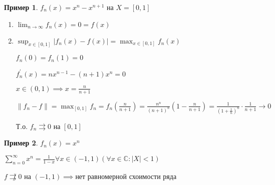 \documentclass{book}
\renewcommand\C{\ensuremath{\mathbb{C}}}
\newcommand{\p}[1]{#1^{\prime}}
\theoremstyle{definition}
\newtheorem*{example}{Пример}
\begin{document}
    \begin{example}
        $f_n(x) = x^n - x^{n+1}$ на  $X = [0,1]$

         \begin{enumerate}
             \item $\lim_{n \to \infty} f_n(x) = 0 = f(x)$
             \item $\sup_{x\in [0,1]}|f_n(x) - f(x)| = \max_{x\in [0,1]} f_n(x)$ 

                 $f_n(0) = f_n(1) = 0$

                 $\p f_n(x) = nx^{n-1} - (n+1)x^n = 0$

                 $x\in \left(0,1 \right) \implies x = \frac{n}{n+1}$ 

                 $\|f_n - f\| = \max_{[0,1]}f_n = f_n\left( \frac{n}{n+1} \right) =\frac{n^n}{(n+1)^n}\left( 1 - \frac{n}{n+1} \right) = \frac{1}{\left( 1 + \frac{1}{n} \right) ^n}\cdot \frac{1}{n+1} \to 0$ 

                 Т.о. $f_n\rightrightarrows 0$ на  $[0,1]$
        \end{enumerate}
    \end{example}

    \begin{example}
        $f_n(x) = x^n$

        $\sum_{n=0}^{\infty } x^n = \frac{1}{1-x} \forall x\in \left( -1,1 \right) \left( \forall x\in \C: |X|<1 \right) $ 

        $f \not\rightrightarrows 0$ на  $\left( -1,1 \right) \implies $нет равномерной схоимости ряда
    \end{example}
\end{document}
